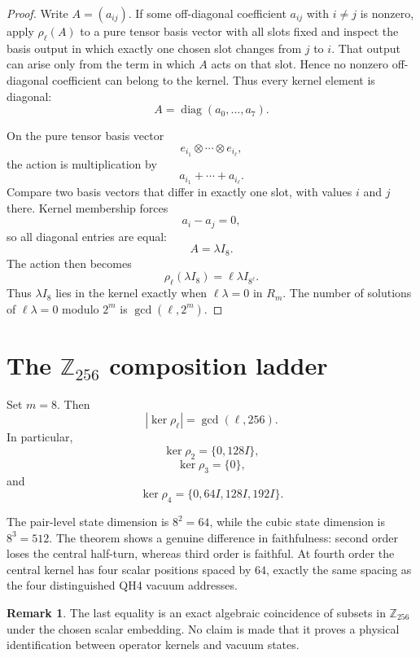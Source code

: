 \documentclass[11pt]{article}
\theoremstyle{definition}
\newtheorem{remark}[theorem]{Remark}
\newcommand{\Z}{\mathbb Z}
\begin{document}
\begin{proof}
Write $A=(a_{ij})$. If some off-diagonal coefficient $a_{ij}$ with $i\ne j$ is nonzero, apply $\rho_\ell(A)$ to a pure tensor basis vector with all slots fixed and inspect the basis output in which exactly one chosen slot changes from $j$ to $i$. That output can arise only from the term in which $A$ acts on that slot. Hence no nonzero off-diagonal coefficient can belong to the kernel. Thus every kernel element is diagonal:
\[
A=\operatorname{diag}(a_0,\ldots,a_7).
\]

On the pure tensor basis vector
\[
e_{i_1}\otimes\cdots\otimes e_{i_\ell},
\]
the action is multiplication by
\[
a_{i_1}+\cdots+a_{i_\ell}.
\]
Compare two basis vectors that differ in exactly one slot, with values $i$ and $j$ there. Kernel membership forces
\[
a_i-a_j=0,
\]
so all diagonal entries are equal:
\[
A=\lambda I_8.
\]
The action then becomes
\[
\rho_\ell(\lambda I_8)=\ell\lambda I_{8^\ell}.
\]
Thus $\lambda I_8$ lies in the kernel exactly when $\ell\lambda=0$ in $R_m$. The number of solutions of $\ell\lambda=0$ modulo $2^m$ is $\gcd(\ell,2^m)$.
\end{proof}

\section{The $\Z_{256}$ composition ladder}
Set $m=8$. Then
\[
|\ker\rho_\ell|=\gcd(\ell,256).
\]
In particular,
\[
\ker\rho_2=\{0,128I\},
\]
\[
\ker\rho_3=\{0\},
\]
and
\[
\ker\rho_4=\{0,64I,128I,192I\}.
\]

The pair-level state dimension is $8^2=64$, while the cubic state dimension is $8^3=512$. The theorem shows a genuine difference in faithfulness: second order loses the central half-turn, whereas third order is faithful. At fourth order the central kernel has four scalar positions spaced by $64$, exactly the same spacing as the four distinguished QH4 vacuum addresses.

\begin{remark}
The last equality is an exact algebraic coincidence of subsets in $\Z_{256}$ under the chosen scalar embedding. No claim is made that it proves a physical identification between operator kernels and vacuum states.
\end{remark}
\end{document}
